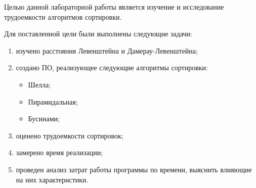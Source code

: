 Целью данной лабораторной работы является изучение и исследование трудоемкости алгоритмов сортировки.

Для поставленной цели были выполнены следующие задачи:
\begin{enumerate}[label={\arabic*)}]
	\item изучено расстояния Левенштейна и Дамерау-Левенштейна;
	\item создано ПО, реализующее следующие алгоритмы сортировки:
	\begin{itemize}
		\item Шелла;
		\item Пирамидальная;
		\item Бусинами;
	\end{itemize}
	\item оценено трудоемкости сортировок;
	\item замерено время реализации;
	\item проведен анализ затрат работы программы по времени, выяснить влияющие на них характеристики.
\end{enumerate}